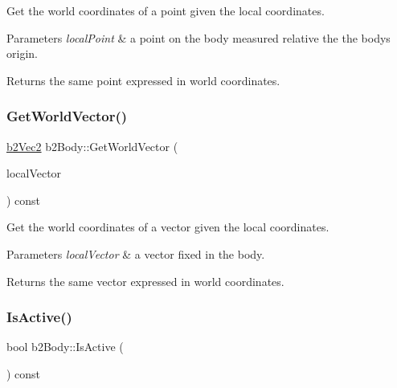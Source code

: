 Get the world coordinates of a point given the local coordinates. 
\begin{DoxyParams}{Parameters}
{\em local\+Point} & a point on the body measured relative the the body\textquotesingle{}s origin. \\
\hline
\end{DoxyParams}
\begin{DoxyReturn}{Returns}
the same point expressed in world coordinates. 
\end{DoxyReturn}
\mbox{\label{classb2_body_ae8c434785b2a730f7c385e708b345bb6}} 
\subsubsection{\texorpdfstring{GetWorldVector()}{GetWorldVector()}}
{\footnotesize\ttfamily \mbox{\hyperlink{structb2_vec2}{b2\+Vec2}} b2\+Body\+::\+Get\+World\+Vector (\begin{DoxyParamCaption}\item[{const \mbox{\hyperlink{structb2_vec2}{b2\+Vec2}} \&}]{local\+Vector }\end{DoxyParamCaption}) const\hspace{0.3cm}{\ttfamily [inline]}}

Get the world coordinates of a vector given the local coordinates. 
\begin{DoxyParams}{Parameters}
{\em local\+Vector} & a vector fixed in the body. \\
\hline
\end{DoxyParams}
\begin{DoxyReturn}{Returns}
the same vector expressed in world coordinates. 
\end{DoxyReturn}
\mbox{\label{classb2_body_a825f37f457d3674ace96e2b8a9b4cae6}} 
\subsubsection{\texorpdfstring{IsActive()}{IsActive()}}
{\footnotesize\ttfamily bool b2\+Body\+::\+Is\+Active (\begin{DoxyParamCaption}{ }\end{DoxyParamCaption}) const\hspace{0.3cm}{\ttfamily [inline]}}



